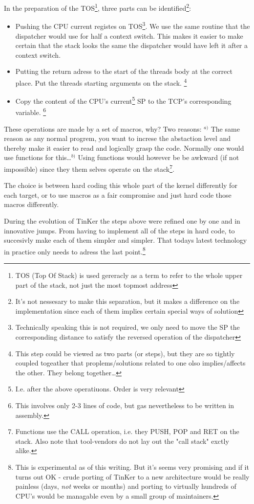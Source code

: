 {		In the preparation of the TOS\footnote{TOS (Top Of Stack) is used gereracly as a term to refer to the whole upper part of the stack, not just the most topmost address}, three parts can be identified\footnote{It's not nessesary to make this separation, but it makes a difference on the implementation since each of them implies certain special ways of solution}:
		\begin{itemize}
			\item Pushing the CPU current registes on TOS\footnote{Technically speaking this is not required, we only need to move the SP the corresponding distance to satisfy the reversed operation of the dispatcher}. We use the same routine that the dispatcher would use for half a context switch. This makes it easier to make certain that the stack looks the same the dispatcher would have left it after a context switch.
			\item Putting the return adress to the start of the threads body at the correct place.  Put the threads starting arguments on the stack. \footnote{This step could be viewed as two parts (or steps), but they are so tightly coupled togeather that proplems/solutions related to one olso implies/affects the other. They belong together\ldots}	
			\item Copy the content of the CPU's current\footnote{I.e. after the above operatiuons. Order is very relevant} SP to the TCP's corresponding variable. \footnote{This involves only 2-3 lines of code, but gas nevertheless to be written in assembly.}
		\end{itemize}
		These operations are made by a set of macros, why? Two reasons: $^{a)}$ The same reason as any normal progrem, you want to increse the abstaction level and thereby make it easier to read and logically grasp the code. Normally one would use functions for this\ldots $^{b)}$ Using functions would however be be awkward (if not impossible) since they them selves operate on the stack\footnote{Functions use the CALL operation, i.e. they PUSH, POP and RET on the stack. Also note that tool-vendors do not lay out the "call stack" exctly alike.}.

		The choice is between hard coding this whole part of the kernel differently for each target, or to use macros as a fair compromise and just hard code those macros differently.

		During the evolution of TinKer the steps above were refined one by one and in innovative jumps. From having to implement all of the steps in hard code, to succesivly make each of them simpler and simpler. That todays latest technology in practice only needs to adress the last point.\footnote{This is experimental as of this writing. But it's seems very promising and if it turns out OK - crude porting of TinKer to a new architecture would be really painless (days, \textit{not} weeks or months) and porting to virtually hundreds of CPU's would be managable even by a small group of maintainers.}

}
